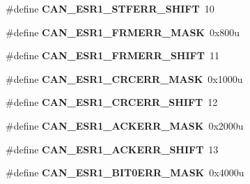 \begin{DoxyCompactItemize}
\item 
\#define {\bfseries C\+A\+N\+\_\+\+E\+S\+R1\+\_\+\+S\+T\+F\+E\+R\+R\+\_\+\+S\+H\+I\+FT}~10\hypertarget{group__CAN__Register__Masks_ga5f22b1b4cc45dbd63a5adb638b7c61a2}{}\label{group__CAN__Register__Masks_ga5f22b1b4cc45dbd63a5adb638b7c61a2}

\item 
\#define {\bfseries C\+A\+N\+\_\+\+E\+S\+R1\+\_\+\+F\+R\+M\+E\+R\+R\+\_\+\+M\+A\+SK}~0x800u\hypertarget{group__CAN__Register__Masks_ga85fea1af50a657cc862d71d166949cbd}{}\label{group__CAN__Register__Masks_ga85fea1af50a657cc862d71d166949cbd}

\item 
\#define {\bfseries C\+A\+N\+\_\+\+E\+S\+R1\+\_\+\+F\+R\+M\+E\+R\+R\+\_\+\+S\+H\+I\+FT}~11\hypertarget{group__CAN__Register__Masks_ga0efc518d9eecfd7ed1eaefac3fd8ec23}{}\label{group__CAN__Register__Masks_ga0efc518d9eecfd7ed1eaefac3fd8ec23}

\item 
\#define {\bfseries C\+A\+N\+\_\+\+E\+S\+R1\+\_\+\+C\+R\+C\+E\+R\+R\+\_\+\+M\+A\+SK}~0x1000u\hypertarget{group__CAN__Register__Masks_gaaafa0a40c19015f5bc060267b18f2433}{}\label{group__CAN__Register__Masks_gaaafa0a40c19015f5bc060267b18f2433}

\item 
\#define {\bfseries C\+A\+N\+\_\+\+E\+S\+R1\+\_\+\+C\+R\+C\+E\+R\+R\+\_\+\+S\+H\+I\+FT}~12\hypertarget{group__CAN__Register__Masks_ga1df87f92bcad133cc7c2677958c95ce4}{}\label{group__CAN__Register__Masks_ga1df87f92bcad133cc7c2677958c95ce4}

\item 
\#define {\bfseries C\+A\+N\+\_\+\+E\+S\+R1\+\_\+\+A\+C\+K\+E\+R\+R\+\_\+\+M\+A\+SK}~0x2000u\hypertarget{group__CAN__Register__Masks_ga10e077761a90dda3310ffc53a98569a7}{}\label{group__CAN__Register__Masks_ga10e077761a90dda3310ffc53a98569a7}

\item 
\#define {\bfseries C\+A\+N\+\_\+\+E\+S\+R1\+\_\+\+A\+C\+K\+E\+R\+R\+\_\+\+S\+H\+I\+FT}~13\hypertarget{group__CAN__Register__Masks_gabe4b1042038801b2ec9d302339d6869b}{}\label{group__CAN__Register__Masks_gabe4b1042038801b2ec9d302339d6869b}

\item 
\#define {\bfseries C\+A\+N\+\_\+\+E\+S\+R1\+\_\+\+B\+I\+T0\+E\+R\+R\+\_\+\+M\+A\+SK}~0x4000u\hypertarget{group__CAN__Register__Masks_gadd6b78abb7a9321af68208f318c7c116}{}\label{group__CAN__Register__Masks_gadd6b78abb7a9321af68208f318c7c116}


\end{DoxyCompactItemize}
